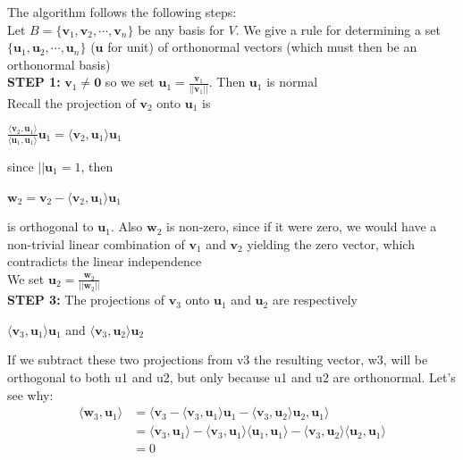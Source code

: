 \documentclass{report}
\begin{document}
The algorithm follows the following steps: \\
Let $B = \{ \mathbf{v}_1, \mathbf{v}_2, \cdots, \mathbf{v}_{n} \}$ be any basis for $V$. We give a rule for determining a set  $\{ \mathbf{u}_1, \mathbf{u}_2, \cdots, \mathbf{u}_{n} \}$ ($\mathbf{u}$ for unit) of orthonormal vectors (which must then be an orthonormal basis)
\\ \textbf{STEP 1: } $\mathbf{v}_1 \ne \mathbf{0}$ so we set $\mathbf{u}_1 = \frac{\mathbf{v}_1}{\vert \vert \mathbf{v}_1 \vert \vert}$. Then $\mathbf{u}_1$ is normal
\\ Recall the projection of $\mathbf{v}_2$ onto $\mathbf{u}_1$ is \\
\begin{center}
    $\frac{\langle \mathbf{v}_2, \mathbf{u}_1 \rangle}{\langle \mathbf{u}_1, \mathbf{u}_1 \rangle} \mathbf{u}_1 = \langle \mathbf{v}_2, \mathbf{u}_1 \rangle \mathbf{u}_1$
\end{center}
since $\vert \vert \mathbf{u}_1 = 1$, then
\begin{center}
    $\mathbf{w}_2 = \mathbf{v}_2 - \langle \mathbf{v}_2, \mathbf{u}_1 \rangle \mathbf{u}_1$
\end{center}
is orthogonal to $\mathbf{u}_1$. Also $\mathbf{w}_2$ is non-zero,  since if it were
zero, we would have a non-trivial linear combination of $\mathbf{v}_1$ and $\mathbf{v}_2$ yielding the zero
vector, which contradicts the linear independence
\\ We set $\mathbf{u}_2 = \frac{\mathbf{w}_2}{\vert \vert \mathbf{w}_2 \vert \vert}$
\\ \textbf{STEP 3: } The projections of $\mathbf{v}_3$ onto $\mathbf{u}_1$ and $\mathbf{u}_2 $ are respectively
\begin{center}
    $\langle \mathbf{v}_3, \mathbf{u}_1 \rangle \mathbf{u}_1$ and ${\langle \mathbf{v}_3, \mathbf{u}_2 \rangle \mathbf{u}_2}$\\    
\end{center}
    If we subtract these two projections from v3 the resulting vector, w3, will be orthogonal to both u1 and u2, but only because u1 and u2 are orthonormal. Let’s see
why:\\
\[
\begin{aligned}
    \langle \mathbf{w}_3, \mathbf{u}_1 \rangle  & = \langle \mathbf{v}_3 - \langle \mathbf{v}_3, \mathbf{u}_1 \rangle \mathbf{u}_1 - \langle \mathbf{v}_3, \mathbf{u}_2 \rangle \mathbf{u}_2, \mathbf{u}_1 \rangle \\
     & = \langle \mathbf{v}_3, \mathbf{u}_1 \rangle - \langle \mathbf{v}_3, \mathbf{u}_1 \rangle \langle \mathbf{u}_1, \mathbf{u}_1 \rangle - \langle \mathbf{v}_3, \mathbf{u}_2 \rangle \langle \mathbf{u}_2, \mathbf{u}_1 \rangle \\  & = 0
\end{aligned}
\]
\end{document}
